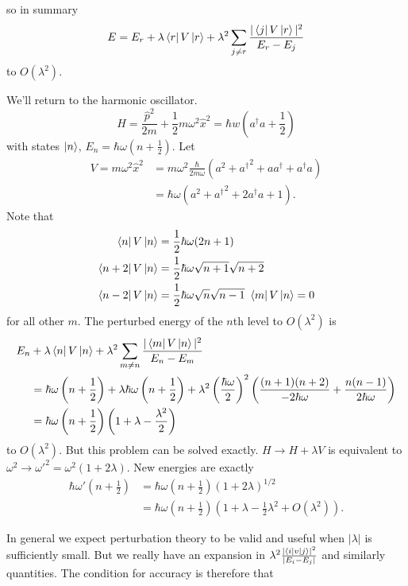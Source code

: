 \documentclass{article}
\begin{document}
so in summary
\[
	E = E_r + \lambda \bra r V\ket r + \lambda^2 \sum_{j\ne r} \frac{|\bra j V \ket r |^2}{E_r-E_j}
\]
to $ O(\lambda^2) $.
\begin{example}
	We'll return to the harmonic oscillator.
	\[
		H = \frac{\hat p^2}{2m} + \frac 12 m\omega^2 \hat x^2 = \hbar w\left(a^\dagger a + \frac 12\right)
	\]
	with states $ \ket n $, $ E_n = \hbar \omega\left(n + \frac 12 \right) $. Let 
	\begin{align*}
		V = m\omega^2\hat x^2 &= m\omega^2 \frac\hbar{2m\omega}(a^2 + {a^\dagger}^2 + aa^\dagger + a^\dagger a) \\
				      &= \hbar \omega(a^2 + {a^\dagger}^2 + 2a^\dagger a + 1).
	\end{align*}
	Note that 
	\begin{align*}
		\bra n V \ket n &= \frac 12 \hbar \omega (2n+1) \\
		\bra{n+2} V \ket n &= \frac 12 \hbar \omega \sqrt{n+1}\sqrt{n+2} \\
		\bra{n-2} V \ket n &= \frac 12 \hbar \omega \sqrt n \sqrt{n-1} \
		\bra{m} V \ket n = 0
	\end{align*}
	for all other $ m $. The perturbed energy of the $ n $th level to $ O(\lambda^2) $ is
	\begin{align*}
		E_n & + \lambda\bra n V \ket n + \lambda^2 \sum_{m\ne n } \frac{|\bra m V \ket n|^2}{E_n-E_m} \\
		&= \hbar \omega\left(n+\frac 12\right) + \lambda \hbar \omega\left(n+\frac 12\right) + \lambda^2 \left(\frac{\hbar \omega}2\right)^2\left(\frac{(n+1)(n+2)}{-2\hbar \omega} + \frac{n(n-1)}{2\hbar \omega}\right) \\
													 &= \hbar \omega\left(n+\frac 12\right) \left(1+\lambda - \frac{\lambda^2}2\right)
	\end{align*}
	to $ O(\lambda^2) $. But this problem can be solved exactly. $ H\to H +\lambda V $ is equivalent to $ \omega^2 \to {\omega'}^2 = \omega^2(1+2\lambda) $. New energies are exactly
	\begin{align*}
		\hbar\omega'\left(n+\frac 12\right) &=\hbar \omega\left(n+\frac 12\right)\left(1+2\lambda\right)^{1/2} \\
						    &= \hbar \omega\left(n+\frac 12 \right) \left(1+\lambda - \frac 12 \lambda^2 + O(\lambda^2)\right).
	\end{align*}
\end{example}
In general we expect perturbation theory to be valid and useful when $ |\lambda| $ is sufficiently small. But we really have an expansion in $ \lambda^2 \frac{|\bra i v \ket j|^2}{|E_i-E_j|} $ and similarly quantities. The condition for accuracy is therefore that
\end{document}
